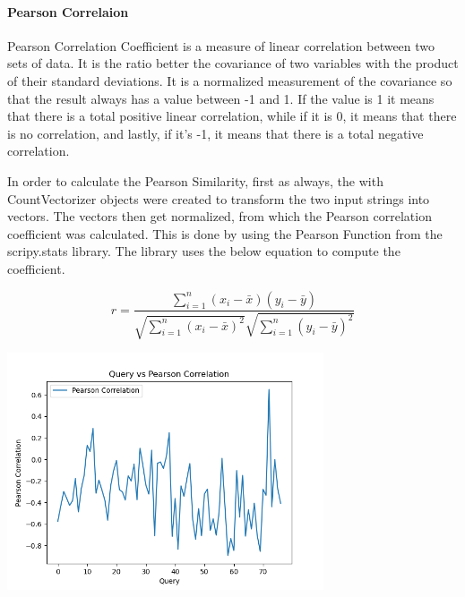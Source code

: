 \documentclass[50pt]{usiinfbachelorproject}
\begin{document}
\paragraph{Pearson Correlaion}
Pearson Correlation Coefficient \cite{cohen2009pearson} is a measure of linear correlation between two sets of data. It is the ratio better the covariance of two variables with the product of their standard deviations. It is a normalized measurement of the covariance so that the result always has a value between -1 and 1. If the value is 1 it means that there is a total positive linear correlation, while if it is 0, it means that there is no correlation, and lastly, if it's -1, it means that there is a total negative correlation.

In order to calculate the Pearson Similarity, first as always, the with CountVectorizer objects were created to transform the two input strings into vectors. The vectors then get normalized, from which the Pearson correlation coefficient was calculated. This is done by using the Pearson Function from the scripy.stats library. The library uses the below equation to compute the coefficient.

\begin{equation}
  r = \frac{\sum_{i=1}^{n} (x_i - \bar{x})(y_i - \bar{y})}{\sqrt{\sum_{i=1}^{n} (x_i - \bar{x})^2} \sqrt{\sum_{i=1}^{n} (y_i - \bar{y})^2}}
\end{equation}
\noindent
  \begin{minipage}{\linewidth}
  \centering
  \includegraphics[width=0.7\textwidth]{images/pearson-correlation.png}
  \label{fig:pearson-correlation}
  \end{minipage}
  \\
\end{document}
